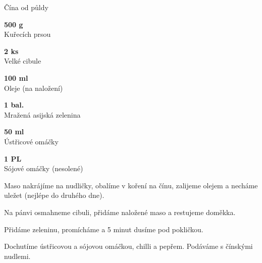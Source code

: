 \documentclass[11pt,a4paper]{article}
\begin{document}
\begin{recipe}[ForestGreen]{Čína od půldy}
    \begin{ingredients}
        \item \parbox[t]{\linewidth}{\raggedright \weight \textbf{500 g}\\ Kuřecích prsou}
        \item \parbox[t]{\linewidth}{\raggedright \piece \textbf{2 ks}\\ Velké cibule}
        \item \parbox[t]{\linewidth}{\raggedright \liquid \textbf{100 ml}\\ Oleje (na naložení)}
        \item \parbox[t]{\linewidth}{\raggedright \piece \textbf{1 bal.}\\ Mražená asijská zelenina}
        \item \parbox[t]{\linewidth}{\raggedright \spoon \textbf{50 ml}\\ Ústřicové omáčky}
        \item \parbox[t]{\linewidth}{\raggedright \spoon \textbf{1 PL}\\ Sójové omáčky (nesolené)}
    \end{ingredients}
    \begin{steps}
        \item Maso nakrájíme na nudličky, obalíme v koření na čínu, zalijeme olejem a necháme uležet (nejlépe do druhého dne).
        \item Na pánvi osmahneme cibuli, přidáme naložené maso a restujeme doměkka.
        \item Přidáme zeleninu, promícháme a 5 minut dusíme pod pokličkou.
        \item Dochutíme ústřicovou a sójovou omáčkou, chilli a pepřem. Podáváme s čínskými nudlemi.
    \end{steps}
\end{recipe}
\end{document}
